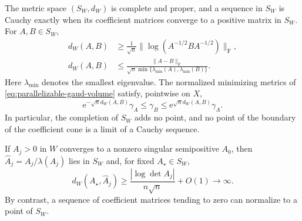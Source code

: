 \begin{theorem}\label{thm:parallelizable-unit-volume-completion}
The metric space $(S_W,d_W)$ is complete and proper, and a sequence in $S_W$ is Cauchy exactly when its coefficient matrices converge to a positive matrix in $S_W$. For $A,B\in S_W$,
\begin{align}
 d_W(A,B)&\geq\frac1{\sqrt n}
       \|\log(A^{-1/2}BA^{-1/2})\|_{\mathrm F},\label{eq:parallelizable-intrinsic-lower}\\
 d_W(A,B)&\leq\frac{\|A-B\|_{\mathrm F}}
       {\sqrt n\min\{\lambda_{\min}(A),\lambda_{\min}(B)\}}.
       \label{eq:parallelizable-intrinsic-upper}
\end{align}
Here $\lambda_{\min}$ denotes the smallest eigenvalue. The normalized minimizing metrics of \eqref{eq:parallelizable-gaud-volume} satisfy, pointwise on $X$,
\begin{equation}\label{eq:parallelizable-minimizer-order}
 \mathrm e^{-\sqrt n d_W(A,B)}\gamma_A
 \leq\gamma_B\leq\mathrm e^{\sqrt n d_W(A,B)}\gamma_A.
\end{equation}
In particular, the completion of $S_W$ adds no point, and no point of the boundary of the coefficient cone is a limit of a Cauchy sequence.

If $A_j>0$ in $W$ converges to a nonzero singular semipositive $A_0$, then $\widehat A_j=A_j/\lambda(A_j)$ lies in $S_W$ and, for fixed $A_\star\in S_W$,
\begin{equation}\label{eq:parallelizable-singular-boundary-rate}
 d_W(A_\star,\widehat A_j)
 \geq\frac{|\log\det A_j|}{n\sqrt n}+O(1)
 \longrightarrow\infty.
\end{equation}
By contrast, a sequence of coefficient matrices tending to zero can normalize to a point of $S_W$.
\end{theorem}

